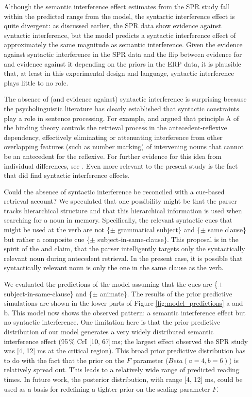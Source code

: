 \documentclass[a4paper, man, floatsintext]{apa7}
\begin{document}
Although the semantic interference effect estimates from the SPR study fall within the predicted range from the model, the syntactic interference effect is quite divergent: as discussed earlier, the SPR data show evidence against syntactic interference, but the model predicts a syntactic interference effect of approximately the same magnitude as semantic interference. Given the evidence against syntactic interference in the SPR data and the flip between evidence for and evidence against it depending on the priors in the ERP data, it is plausible that, at least in this experimental design and language, syntactic interference plays little to no role. 

The absence of (and evidence against) syntactic interference is surprising because the psycholinguistic literature has clearly established that syntactic constraints play a role in sentence processing. For example, \textcite{dillon2013} and \textcite{Sturt2003} argued that principle A of the binding theory controls the retrieval process in the antecedent-reflexive dependency, effectively eliminating or attenuating interference from other overlapping features (such as number marking) of intervening nouns that cannot be an antecedent for the reflexive. For further evidence for this idea from individual differences, see \textcite{yadav2021individual}. Even more relevant to the present study is the fact that \textcite{mertzen} did find syntactic interference effects. 

Could the absence of syntactic interference be reconciled with a cue-based retrieval account? We speculated that one possibility might be that the parser tracks hierarchical structure and that this hierarchical information is used when searching for a noun in memory. Specifically, the relevant syntactic cues that might be used at the verb are not  \{$\pm$ grammatical subject\} and \{$\pm$ same clause\} but rather a composite cue \{$\pm$ subject-in-same-clause\}. This proposal is in the spirit of the  \textcite{dillon2013} and \textcite{Sturt2003} claim, that the parser intelligently targets only the syntactically relevant noun during antecedent retrieval.  In the present case, it is possible that syntactically relevant noun is only the one in the same clause as the verb.

We evaluated the predictions of the model assuming that the cues are \{$\pm$ subject-in-same-clause\} and \{$\pm$ animate\}. The results of the prior predictive simulations are shown in the lower parts of Figure \ref{fig:model_predictions} a and b. This model now shows the observed pattern: a semantic interference effect but no syntactic interference. One limitation here is that the prior predictive distribution of our model generates a very widely distributed semantic interference effect (95\,\% CrI [10, 67]\,ms; the largest effect observed the SPR study was [4, 12] ms at the critical region). This broad prior predictive distribution has to do with the fact that the prior on the $F$ parameter ($Beta(a=4,b=6)$) is relatively spread out. This leads to a relatively wide range of predicted reading times. In future work, the posterior distribution, with range  [4, 12] ms, could be used as a basis for redefining a tighter prior on the scaling parameter $F$. 
\end{document}
